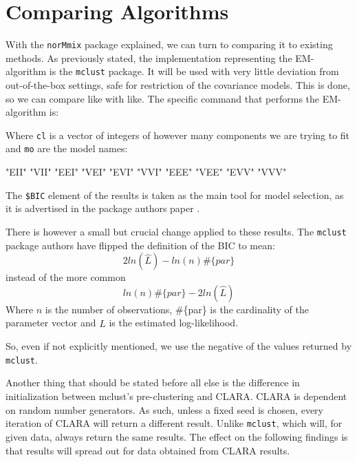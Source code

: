 \chapter{Comparing Algorithms}


With the {\tt norMmix} package explained, we can turn to comparing it to 
existing methods. As previously stated, the implementation representing the 
EM-algorithm is the {\tt mclust} package. It will be used with very little 
deviation from out-of-the-box settings, safe for restriction of the covariance 
models. This is done, so we can compare like with like.
The specific command that performs the EM-algorithm is:

\begin{Schunk}
\end{Schunk}

Where {\tt cl} is a vector of integers of however many components we are trying 
to fit and {\tt mo} are the model names:

\begin{Schunk}
\begin{Soutput}
 [1] "EII" "VII" "EEI" "VEI" "EVI" "VVI" "EEE" "VEE" "EVV" "VVV"
\end{Soutput}
\end{Schunk}

The {\tt \$BIC} element of the results is taken as the main tool for model 
selection, as it is advertised in the package authors paper \cite{Scr16}.

There is however a small but crucial change applied to these results.
The {\tt mclust} package authors have flipped the definition of the BIC to mean:
\begin{equation} 
    2 ln(\hat{L}) - ln(n) \#\{par\}
\end{equation}
instead of the more common
\begin{equation} 
    ln(n) \#\{par\} - 2 ln(\hat{L})
    \label{eqn:BIC}
\end{equation}
Where $n$ is the number of observations, \#\{par\} is the cardinality of the 
parameter vector and $$ is the estimated log-likelihood.

So, even if not explicitly mentioned, we use the negative of the values returned
by {\tt mclust}.

Another thing that should be stated before all else is the difference in 
initialization between {mclust}'s pre-clustering and CLARA. CLARA is dependent
on random number generators. As such, unless a fixed seed is chosen, every 
iteration of CLARA will return a different result. Unlike {\tt mclust}, which 
will, for given data, always return the same results. The effect on the 
following findings is that results will spread out for data obtained from 
CLARA results.

